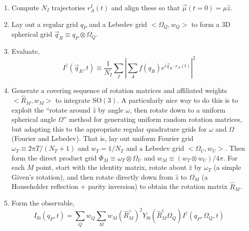 \documentclass[fleqn,oneside,12pt]{article}
\begin{document}
\begin{enumerate}
\item Compute $N_I$ trajectories $r_{A}^{I} (t)$ and align these so that 
$\vec \mu (t = 0) = \mu \hat z$.
\item Lay out a regular grid $q_P$ and a Lebedev grid $<\Omega_Q, w_Q>$ to form
a 3D spherical grid $\vec q_R \equiv q_{P} \otimes \Omega_{Q}$.
\item Evaluate,
\[
I^{\hat z} (\vec q_R, t)
\equiv
\frac{1}{N_I}
\sum_{I}
\left |
\sum_{A}
f (q_R)
e^{i \vec q_R \cdot r_A (t)}
\right |^2
\]
\item Generate a covering sequence of rotation matrices and affiliated weights
$<\hat R_{M}, w_{M}>$ to integrate SO$(3)$. A particularly nice way to do this
is to exploit the ``rotate around $\hat z$ by angle $\omega$, then rotate down
to a uniform spherical angle $\Omega$'' method for generating uniform random
rotation matrices, but adapting this to the appropriate regular quadrature grids
for $\omega$ and $\Omega$ (Fourier and Lebedev).  That is, lay out uniform
Fourier grid $\omega_{T} \equiv 2 \pi T / (N_{T} + 1)$ and $w_T = 1 / N_{T}$ and
a Lebedev grid $<\Omega_{U}, w_{U}>$. Then form the direct product grid
$\Phi_{M} \equiv \omega_{T} \otimes \Omega_{U}$ and $w_{M} \equiv (w_{T} \otimes
w_{U}) / 4 \pi$.  For each $M$ point, start with the identity matrix, rotate
about $\hat z$ by $\omega_T$ (a simple Given's rotation), and then rotate
directly down from $\hat z$ to $\Omega_M$ (a Householder reflection + parity
inversion) to obtain the rotation matrix $\hat R_M$.

\item Form the observable,
\[
I_{l0} (q_{P}, t)
=
\sum_{Q}
w_{Q}
\sum_{M}
w_{M}
(\hat R_{M}^{z})^2
Y_{l0} (\hat R_{M}^{\dagger} \Omega_{Q})
I^{\hat z}
(q_{P}, \Omega_{Q}, t)
\]

\end{enumerate}
\end{document}
